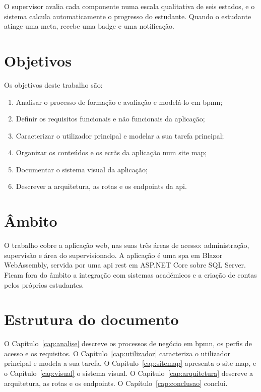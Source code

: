 O supervisor avalia cada componente numa escala qualitativa de seis estados, e o sistema calcula automaticamente o progresso do estudante. Quando o estudante atinge uma meta, recebe uma \gls{badge} e uma notificação.


\section{Objetivos}

Os objetivos deste trabalho são:

\begin{enumerate}
    \item Analisar o processo de formação e avaliação e modelá-lo em \gls{bpmn};
    \item Definir os requisitos funcionais e não funcionais da aplicação;
    \item Caracterizar o utilizador principal e modelar a sua tarefa principal;
    \item Organizar os conteúdos e os ecrãs da aplicação num site map;
    \item Documentar o sistema visual da aplicação;
    \item Descrever a arquitetura, as rotas e os endpoints da \gls{api}.
\end{enumerate}

\section{Âmbito}

O trabalho cobre a aplicação web, nas suas três áreas de acesso: administração, supervisão e área do supervisionado. A aplicação é uma \gls{spa} em Blazor WebAssembly, servida por uma \gls{api} \gls{rest} em ASP.NET Core sobre SQL Server. Ficam fora do âmbito a integração com sistemas académicos e a criação de contas pelos próprios estudantes.


\section{Estrutura do documento}

O Capítulo~\ref{cap:analise} descreve os processos de negócio em \gls{bpmn}, os perfis de acesso e os requisitos. O Capítulo~\ref{cap:utilizador} caracteriza o utilizador principal e modela a sua tarefa. O Capítulo~\ref{cap:sitemap} apresenta o site map, e o Capítulo~\ref{cap:visual} o sistema visual. O Capítulo~\ref{cap:arquitetura} descreve a arquitetura, as rotas e os endpoints. O Capítulo~\ref{cap:conclusao} conclui.
